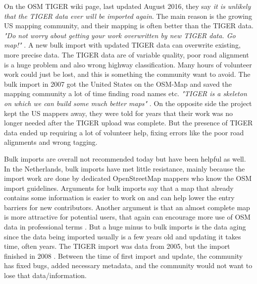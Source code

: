 On the OSM TIGER wiki page, last updated August 2016, they say \textit{it is unlikely that the TIGER data ever will be imported again}. The main reason is the growing US mapping community, and their mapping is often better than the TIGER data. \textit{"Do not worry about getting your work overwritten by new TIGER data. Go map!"}  \cite{WikiOSMTIGER2007}. A new bulk import with updated TIGER data can overwrite existing, more precise data. The TIGER data are of variable quality, poor road alignment is a huge problem and also wrong highway classification. Many hours of volunteer work could just be lost, and this is something the community want to avoid. The bulk import in 2007 got the United States on the OSM-Map and saved the mapping community a lot of time finding road names etc. \textit{"TIGER is a skeleton on which we can build some much better maps"} \cite{Willis2007}. On the opposite side the project kept the US mappers away, they were told for years that their work was no longer needed after the TIGER upload was complete. But the presence of TIGER data ended up requiring a lot of volunteer help, fixing errors like the poor road alignments and wrong tagging. 

Bulk imports are overall not recommended today but have been helpful as well. In the Netherlands, bulk imports have met little resistance, mainly because the import work are done by dedicated OpenStreetMap mappers who know the OSM import guidelines.  Arguments for bulk imports say that a map that already contains some information is easier to work on and can help lower the entry barriers for new contributors. Another argument is that an almost complete map is more attractive for potential users, that again can encourage more use of OSM data in professional terms \cite{Exelvan2010}. But a huge minus to bulk imports is the data aging since the data being imported usually is a few years old and updating it takes time, often years. The TIGER import was data from 2005, but the import finished in 2008 \cite{Zielstra2013}. Between the time of first import and update, the community has fixed bugs, added necessary metadata, and the community would not want to lose that data/information. 


